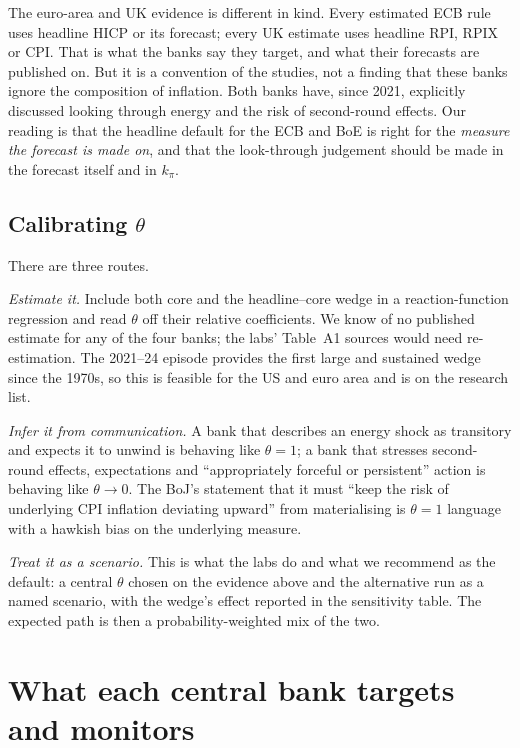 \documentclass[11pt,a4paper]{article}
\begin{document}
The euro-area and UK evidence is different in kind. Every estimated ECB rule uses headline HICP or its forecast; every UK estimate uses headline RPI, RPIX or CPI. That is what the banks say they target, and what their forecasts are published on. But it is a convention of the studies, not a finding that these banks ignore the composition of inflation. Both banks have, since 2021, explicitly discussed looking through energy and the risk of second-round effects. Our reading is that the headline default for the ECB and BoE is right for the \emph{measure the forecast is made on}, and that the look-through judgement should be made in the forecast itself and in $k_\pi$.

\subsection{Calibrating $\theta$}

There are three routes.

\emph{Estimate it.} Include both core and the headline--core wedge in a reaction-function regression and read $\theta$ off their relative coefficients. We know of no published estimate for any of the four banks; the labs' Table~A1 sources would need re-estimation. The 2021--24 episode provides the first large and sustained wedge since the 1970s, so this is feasible for the US and euro area and is on the research list.

\emph{Infer it from communication.} A bank that describes an energy shock as transitory and expects it to unwind is behaving like $\theta=1$; a bank that stresses second-round effects, expectations and ``appropriately forceful or persistent'' action \parencite{ecbstrategy2025} is behaving like $\theta\to0$. The BoJ's statement that it must ``keep the risk of underlying CPI inflation deviating upward'' from materialising is $\theta=1$ language with a hawkish bias on the underlying measure.

\emph{Treat it as a scenario.} This is what the labs do and what we recommend as the default: a central $\theta$ chosen on the evidence above and the alternative run as a named scenario, with the wedge's effect reported in the sensitivity table. The expected path is then a probability-weighted mix of the two.

\section{What each central bank targets and monitors}
\label{sec:measures}
\end{document}
